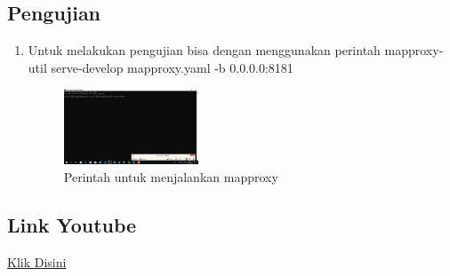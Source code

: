 \subsection{Pengujian}
\begin{enumerate}
    \item Untuk melakukan pengujian bisa dengan menggunakan perintah mapproxy-util serve-develop mapproxy.yaml -b 0.0.0.0:8181
    \hfill\break
    \begin{figure}[H]
		\includegraphics[width=4cm]{figures/1174003/5/5.png}
		\centering
		\caption{Perintah untuk menjalankan mapproxy}
    \end{figure}
\end{enumerate}
\subsection{Link Youtube}
\href{https://youtu.be/zAVZDnuP8K8}{Klik Disini}